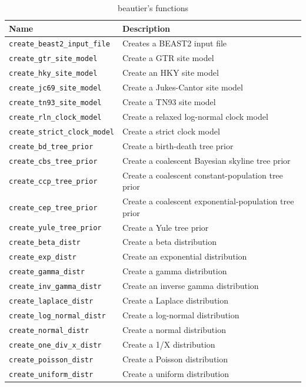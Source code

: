 \documentclass{article}
\begin{document}
\begin{table}[]
\centering
\begin{tabular}{ | l | l | }
\hline
\textbf{Name} & \textbf{Description} \\
\hline
\verb;create_beast2_input_file; & Creates a BEAST2 input file \\
\hline
\verb;create_gtr_site_model; & Create a GTR site model \\
\verb;create_hky_site_model; & Create an HKY site model \\
\verb;create_jc69_site_model; & Create a Jukes-Cantor site model \cite{cantor1969mammalian} \\
\verb;create_tn93_site_model; & Create a TN93 site model \\
\hline
\verb;create_rln_clock_model; & Create a relaxed log-normal clock model \\
\verb;create_strict_clock_model; & Create a strict clock model \\
\hline
\verb;create_bd_tree_prior; & Create a birth-death tree prior \cite{kendall1948generalized} \\
\verb;create_cbs_tree_prior; & Create a coalescent Bayesian skyline tree prior \\
\verb;create_ccp_tree_prior; & Create a coalescent constant-population tree prior \\
\verb;create_cep_tree_prior; & Create a coalescent exponential-population tree prior \\
\verb;create_yule_tree_prior; & Create a Yule tree prior \cite{yule} \\
\hline
\verb;create_beta_distr; & Create a beta distribution \\
\verb;create_exp_distr; & Create an exponential distribution \\
\verb;create_gamma_distr; & Create a gamma distribution \\
\verb;create_inv_gamma_distr; & Create an inverse gamma distribution \\
\verb;create_laplace_distr; & Create a Laplace distribution \\
\verb;create_log_normal_distr; & Create a log-normal distribution \\
\verb;create_normal_distr; & Create a normal distribution \\
\verb;create_one_div_x_distr; & Create a 1/X distribution \\
\verb;create_poisson_distr; & Create a Poisson distribution \\
\verb;create_uniform_distr; & Create a uniform distribution \\
\hline
\end{tabular}
\caption{beautier's functions}
\label{tab:functions}
\end{table}
\end{document}
